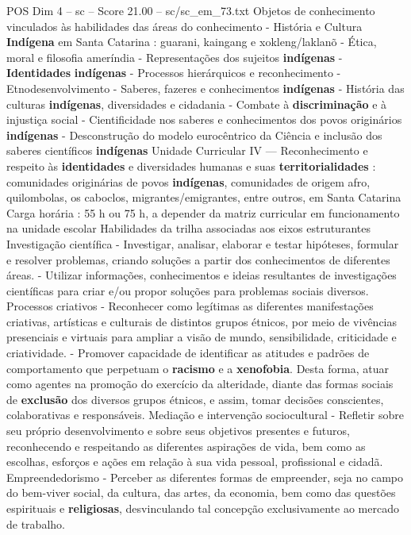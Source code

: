 \begin{textsample}{POS Dim 4 – sc – Score 21.00 – sc/sc\_em\_73.txt}
Objetos de conhecimento vinculados às habilidades das áreas do conhecimento - História e Cultura \textbf{Indígena} em Santa Catarina : guarani, kaingang e xokleng/laklanõ - Ética, moral e filosofia ameríndia - Representações dos sujeitos \textbf{indígenas} - \textbf{Identidades} \textbf{indígenas} - Processos hierárquicos e reconhecimento - Etnodesenvolvimento - Saberes, fazeres e conhecimentos \textbf{indígenas} - História das culturas \textbf{indígenas}, diversidades e cidadania - Combate à \textbf{discriminação} e à injustiça social - Cientificidade nos saberes e conhecimentos dos povos originários \textbf{indígenas} - Desconstrução do modelo eurocêntrico da Ciência e inclusão dos saberes científicos \textbf{indígenas} Unidade Curricular IV — Reconhecimento e respeito às \textbf{identidades} e diversidades humanas e suas \textbf{territorialidades} : comunidades originárias de povos \textbf{indígenas}, comunidades de origem afro, quilombolas, os caboclos, migrantes/emigrantes, entre outros, em Santa Catarina Carga horária : 55 h ou 75 h, a depender da matriz curricular em funcionamento na unidade escolar Habilidades da trilha associadas aos eixos estruturantes Investigação científica - Investigar, analisar, elaborar e testar hipóteses, formular e resolver problemas, criando soluções a partir dos conhecimentos de diferentes áreas. - Utilizar informações, conhecimentos e ideias resultantes de investigações científicas para criar e/ou propor soluções para problemas sociais diversos.
Processos criativos - Reconhecer como legítimas as diferentes manifestações criativas, artísticas e culturais de distintos grupos étnicos, por meio de vivências presenciais e virtuais para ampliar a visão de mundo, sensibilidade, criticidade e criatividade. - Promover capacidade de identificar as atitudes e padrões de comportamento que perpetuam o \textbf{racismo} e a \textbf{xenofobia}.
Desta forma, atuar como agentes na promoção do exercício da alteridade, diante das formas sociais de \textbf{exclusão} dos diversos grupos étnicos, e assim, tomar decisões conscientes, colaborativas e responsáveis.
Mediação e intervenção sociocultural - Refletir sobre seu próprio desenvolvimento e sobre seus objetivos presentes e futuros, reconhecendo e respeitando as diferentes aspirações de vida, bem como as escolhas, esforços e ações em relação à sua vida pessoal, profissional e cidadã.
Empreendedorismo - Perceber as diferentes formas de empreender, seja no campo do bem-viver social, da cultura, das artes, da economia, bem como das questões espirituais e \textbf{religiosas}, desvinculando tal concepção exclusivamente ao mercado de trabalho.

\end{textsample}
